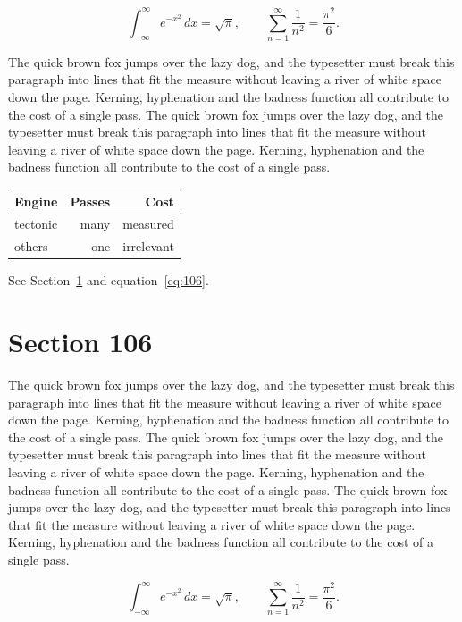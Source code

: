 \documentclass{article}
\begin{document}
\begin{equation}\label{eq:105}
\int_{-\infty}^{\infty} e^{-x^{2}}\,dx = \sqrt{\pi}, \qquad
\sum_{n=1}^{\infty} \frac{1}{n^{2}} = \frac{\pi^{2}}{6}.
\end{equation}

The quick brown fox jumps over the lazy dog, and the typesetter must break this paragraph into lines that fit the measure without leaving a river of white space down the page. Kerning, hyphenation and the badness function all contribute to the cost of a single pass. The quick brown fox jumps over the lazy dog, and the typesetter must break this paragraph into lines that fit the measure without leaving a river of white space down the page. Kerning, hyphenation and the badness function all contribute to the cost of a single pass. 

\begin{center}
\begin{tabular}{lrr}
\toprule
Engine & Passes & Cost \\
\midrule
tectonic & many & measured \\
others & one & irrelevant \\
\bottomrule
\end{tabular}
\end{center}

See Section~\ref{sec:106} and equation~\eqref{eq:106}.
\section{Section 106}
\label{sec:106}
The quick brown fox jumps over the lazy dog, and the typesetter must break this paragraph into lines that fit the measure without leaving a river of white space down the page. Kerning, hyphenation and the badness function all contribute to the cost of a single pass. The quick brown fox jumps over the lazy dog, and the typesetter must break this paragraph into lines that fit the measure without leaving a river of white space down the page. Kerning, hyphenation and the badness function all contribute to the cost of a single pass. The quick brown fox jumps over the lazy dog, and the typesetter must break this paragraph into lines that fit the measure without leaving a river of white space down the page. Kerning, hyphenation and the badness function all contribute to the cost of a single pass. 

\begin{equation}\label{eq:106}
\int_{-\infty}^{\infty} e^{-x^{2}}\,dx = \sqrt{\pi}, \qquad
\sum_{n=1}^{\infty} \frac{1}{n^{2}} = \frac{\pi^{2}}{6}.
\end{equation}
\end{document}
